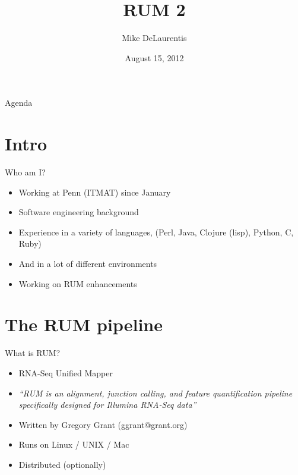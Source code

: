 \documentclass{beamer}
\title[RUM 2]{RUM 2}
\author{Mike DeLaurentis}
\institute{University of Pennsylvania}
\date{August 15, 2012}
\begin{document}
\begin{frame}
\titlepage
\end{frame}

\begin{frame}{Agenda}
  \tableofcontents
\end{frame}

\section{Intro}

\begin{frame}{Who am I?}
  \begin{itemize}
  \item Working at Penn (ITMAT) since January
  \item Software engineering background
  \item Experience in a variety of languages, (Perl, Java, Clojure (lisp), Python, C, Ruby)
  \item And in a lot of different environments
  \item Working on RUM enhancements
  \end{itemize}
\end{frame}

\section{The RUM pipeline}

\begin{frame}{What is RUM?}
  \begin{itemize}
  \item RNA-Seq Unified Mapper
  \item \textit{``RUM is an alignment, junction calling, and feature quantification pipeline specifically designed for Illumina RNA-Seq data''}
  \item Written by Gregory Grant (ggrant@grant.org)
  \item Runs on Linux / UNIX / Mac
  \item Distributed (optionally)
  \end{itemize}
\end{frame}
\end{document}
